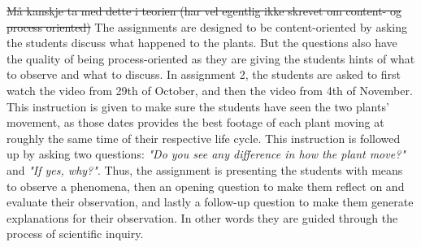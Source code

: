 \sout{Må kanskje ta med dette i teorien (har vel egentlig ikke skrevet om content- og process oriented)}
The assignments are designed to be content-oriented by asking the students discuss what happened to the plants. But the questions also have the quality of being process-oriented as they are giving the students hints of what to observe and what to discuss. In assignment 2, the students are asked to first watch the video from 29th of October, and then the video from 4th of November. This instruction is given to make sure the students have seen the two plants' movement, as those dates provides the best footage of each plant moving at roughly the same time of their respective life cycle. This instruction is followed up by asking two questions: \emph{"Do you see any difference in how the plant move?"} and \emph{"If yes, why?"}. Thus, the assignment is presenting the students with means to observe a phenomena, then an opening question to make them reflect on and evaluate their observation, and lastly a follow-up question to make them generate explanations for their observation. In other words they are guided through the process of scientific inquiry. 


